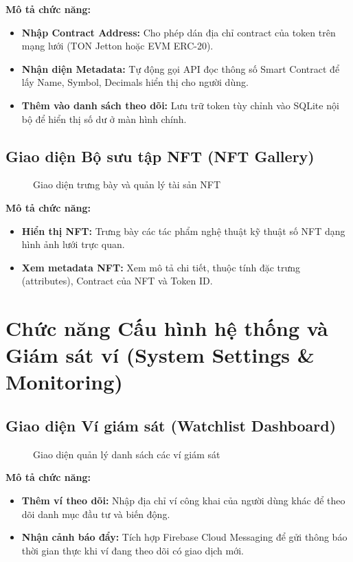 \documentclass[a4paper]{report}
\begin{document}
\textbf{Mô tả chức năng:}
\begin{itemize}
    \item \textbf{Nhập Contract Address:} Cho phép dán địa chỉ contract của token trên mạng lưới (TON Jetton hoặc EVM ERC-20).
    \item \textbf{Nhận diện Metadata:} Tự động gọi API đọc thông số Smart Contract để lấy Name, Symbol, Decimals hiển thị cho người dùng.
    \item \textbf{Thêm vào danh sách theo dõi:} Lưu trữ token tùy chỉnh vào SQLite nội bộ để hiển thị số dư ở màn hình chính.
\end{itemize}

\subsection{Giao diện Bộ sưu tập NFT (NFT Gallery)}
\begin{figure}[h]
    \centering
    \caption{Giao diện trưng bày và quản lý tài sản NFT}
    \label{fig:ui_nft}
\end{figure}

\textbf{Mô tả chức năng:}
\begin{itemize}
    \item \textbf{Hiển thị NFT:} Trưng bày các tác phẩm nghệ thuật kỹ thuật số NFT dạng hình ảnh lưới trực quan.
    \item \textbf{Xem metadata NFT:} Xem mô tả chi tiết, thuộc tính đặc trưng (attributes), Contract của NFT và Token ID.
\end{itemize}

\section{Chức năng Cấu hình hệ thống và Giám sát ví (System Settings \& Monitoring)}

\subsection{Giao diện Ví giám sát (Watchlist Dashboard)}
\begin{figure}[h]
    \centering
    \caption{Giao diện quản lý danh sách các ví giám sát}
    \label{fig:ui_watchlist}
\end{figure}

\textbf{Mô tả chức năng:}
\begin{itemize}
    \item \textbf{Thêm ví theo dõi:} Nhập địa chỉ ví công khai của người dùng khác để theo dõi danh mục đầu tư và biến động.
    \item \textbf{Nhận cảnh báo đẩy:} Tích hợp Firebase Cloud Messaging để gửi thông báo thời gian thực khi ví đang theo dõi có giao dịch mới.
\end{itemize}
\end{document}
